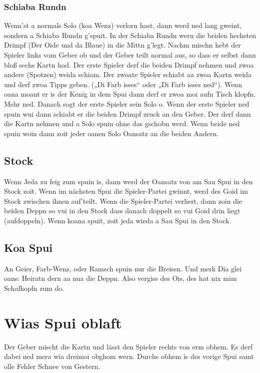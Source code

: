 \documentclass[11pt,a4paper]{scrartcl}		%
\begin{document}
			\subsubsection{Schiaba Rundn}		
			Wenn'st a normals Solo (koa Wenz) verlorn hast, dann werd ned lang gweint, sondern a Schiaba Rundn g'spuit. In der Schiaba Rundn wern die beiden hechsten Drimpf (Der Oide und da Blaue) in die Mittn g'legt. Nachm mischn hebt der Spieler links vom Geber ob und der Geber teilt normal aus, so dass er selbst dann bloß sechs Kartn hod. Der erste Spieler derf die beiden Drimpf nehmen und zwoa andere (Spotzen) weida schiam. Der zwoate Spieler schiabt aa zwoa Kartn weida und derf zwoa Tipps geben. („Di Farb isses“ oder „Di Farb isses ned“). 
			Wenn oana moant er is der Kenig in dem Spui dann derf er zwoa moi aufn Tisch klopfn. Mehr ned. Danach sogt der erste Spieler sein Solo o.
			Wenn der erste Spieler ned spuin wui dann schiabt er die beiden Drimpf zruck an den Geber. Der derf dann die Kartn nehmen und a Solo spuin ohne das gschobn werd. Wenn beide ned spuin woin dann zoit jeder oanen Solo Oansatz an die beiden Andern.



		\subsection{Stock}
		Wenn Jeda zu feig zum spuin is, dann werd der Oansatz von am Sau Spui in den Stock zoit. Wenn im nächsten Spui die Spieler-Partei gwinnt, werd des Goid im Stock zwischen ihnen auf'teilt. Wenn die Spieler-Partei verliert, dann zoin die beiden Deppn so vui in den Stock dass danach doppelt so vui Goid drin liegt (aufdoppeln). Wenn koana spuit, zoit jeda wieda a Sau Spui in den Stock.


		\subsection{Koa Spui}
		An Geier, Farb-Wenz, oder Ramsch spuin nur die Breissn. Und merk Dia glei oans: Heiratn dern aa nua die Deppn. Also vergiss des Ois, des hat nix mim Schafkopfn zum do.  %



	\section{Wias Spui oblaft}

	Der Geber mischt die Kartn und lässt den Spieler rechts von erm obhem. Es derf dabei ned mera wia dreimoi obghom wern. Durchs obhem is des vorige Spui samt olle Fehler Schnee von Gestern. 
\end{document}
